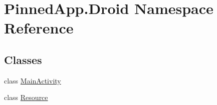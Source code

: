 \hypertarget{namespace_pinned_app_1_1_droid}{}\section{Pinned\+App.\+Droid Namespace Reference}
\label{namespace_pinned_app_1_1_droid}
\subsection*{Classes}
\begin{DoxyCompactItemize}
\item 
class \hyperlink{class_pinned_app_1_1_droid_1_1_main_activity}{Main\+Activity}
\item 
class \hyperlink{class_pinned_app_1_1_droid_1_1_resource}{Resource}
\end{DoxyCompactItemize}
